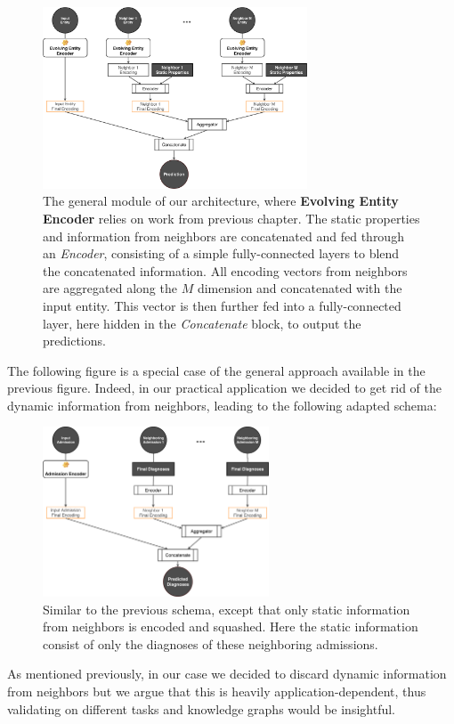 \begin{figure}[H]
 \centering
 \includegraphics[width=0.7\textwidth]{figures/kg-rnn-general.pdf}
 \caption{The general module of our architecture, where \textbf{Evolving Entity Encoder} relies on work from previous chapter. The static properties and information from neighbors are concatenated and fed through an \emph{Encoder}, consisting of a simple fully-connected layers to blend the concatenated information. All encoding vectors from neighbors are aggregated along the $M$ dimension and concatenated with the input entity. This vector is then further fed into a fully-connected layer, here hidden in the \emph{Concatenate} block, to output the predictions.}
 \label{fig:kg-rnn-general}
\end{figure}

The following figure is a special case of the general approach available in the previous figure. Indeed, in our practical application we decided to get rid of the dynamic information from neighbors, leading to the following adapted schema:

\begin{figure}[H]
 \centering
 \includegraphics[width=0.6\textwidth]{figures/kg-rnn-healthcare.pdf}
 \caption{Similar to the previous schema, except that only static information from neighbors is encoded and squashed. Here the static information consist of only the diagnoses of these neighboring admissions.}
 \label{fig:kg-rnn-healthcare}
\end{figure}

As mentioned previously, in our case we decided to discard dynamic information from neighbors but we argue that this is heavily application-dependent, thus validating on different tasks and knowledge graphs would be insightful.